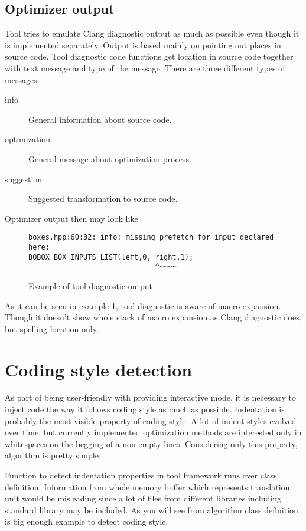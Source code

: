 \subsection{Optimizer output}
Tool tries to emulate Clang diagnostic output as much as possible even though it is implemented separately. Output is based mainly on pointing out places in source code. Tool diagnostic code functions get location in source code together with text message and type of the message. There are three different types of messages:

\begin{description}
\item[info]{General information about source code.}
\item[optimization]{General message about optimization process.}
\item[suggestion]{Suggested transformation to source code.}
\end{description}

Optimizer output then may look like

\begin{figure}[h!]
\label{outputexample}
\caption{Example of tool diagnostic output}
\begin{verbatim}
boxes.hpp:60:32: info: missing prefetch for input declared here:
BOBOX_BOX_INPUTS_LIST(left,0, right,1);
                              ^~~~~
\end{verbatim}
\end{figure}

As it can be seen in example \ref{outputexample}, tool diagnostic is aware of macro expansion. Though it doesn't show whole stack of macro expansion as Clang diagnostic does, but spelling location only.

\section{Coding style detection}
As part of being user-friendly with providing interactive mode, it is necessary to inject code the way it follows coding style as much as possible. Indentation is probably the most visible property of coding style. A lot of indent styles evolved over time, but currently implemented optimization methods are interested only in whitespaces on the begging of a non empty lines. Considering only this property, algorithm is pretty simple.

Function to detect indentation properties in tool framework runs over class definition. Information from whole memory buffer which represents translation unit would be misleading since a lot of files from different libraries including standard library may be included. As you will see from algorithm class definition is big enough example to detect coding style.


